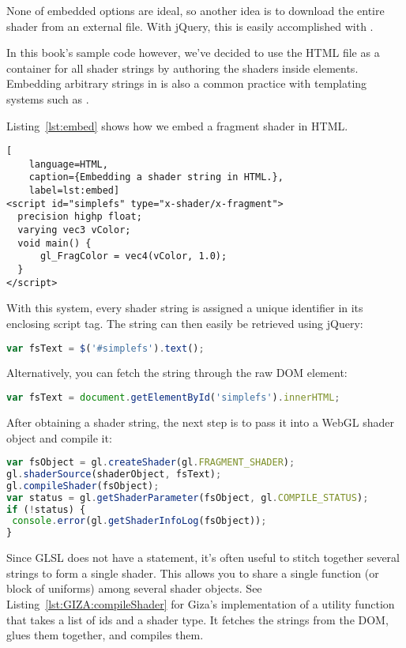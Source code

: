 None of embedded options are ideal, so another idea is to download the entire shader from an external file.  With jQuery, this is easily accomplished with .

In this book's sample code however, we've decided to use the HTML file as a container for all shader strings by authoring the shaders inside  elements.  Embedding arbitrary strings in  is also a common practice with templating systems such as \mbox{}.

Listing~\ref{lst:embed} shows how we embed a fragment shader in HTML.

\begin{lstlisting}[
    language=HTML,
    caption={Embedding a shader string in HTML.},
    label=lst:embed]
<script id="simplefs" type="x-shader/x-fragment">
  precision highp float;
  varying vec3 vColor;
  void main() {
      gl_FragColor = vec4(vColor, 1.0);
  }
</script>
\end{lstlisting}

With this system, every shader string is assigned a unique identifier in its enclosing script tag.  The string can then easily be retrieved using jQuery:

\begin{lstlisting}[language=JavaScript]
var fsText = $('#simplefs').text();
\end{lstlisting} %

Alternatively, you can fetch the string through the raw DOM element:

\begin{lstlisting}[language=JavaScript]
var fsText = document.getElementById('simplefs').innerHTML;
\end{lstlisting}

After obtaining a shader string, the next step is to pass it into a WebGL shader object and compile it:

\begin{lstlisting}[language=JavaScript]
var fsObject = gl.createShader(gl.FRAGMENT_SHADER);
gl.shaderSource(shaderObject, fsText);
gl.compileShader(fsObject);
var status = gl.getShaderParameter(fsObject, gl.COMPILE_STATUS);
if (!status) {
 console.error(gl.getShaderInfoLog(fsObject));
}
\end{lstlisting}

Since GLSL does not have a  statement, it's often useful to stitch together several strings to form a single shader.  This allows you to share a single function (or block of uniforms) among several shader objects.  See Listing~\ref{lst:GIZA:compileShader} for Giza's implementation of a utility function that takes a list of ids and a shader type.  It fetches the strings from the DOM, glues them together, and compiles them.

